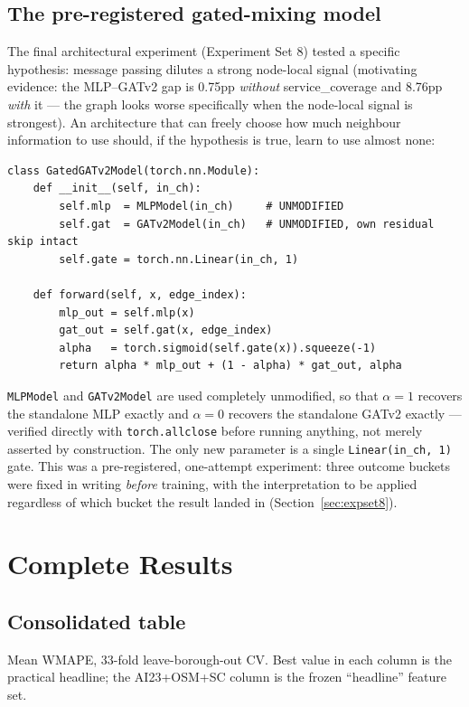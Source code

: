 \documentclass[11pt]{article}
\let\oldsection\section
\renewcommand{\section}[1]{\clearpage\oldsection{\color{sectcolor}#1}}
\let\oldsubsection\subsection
\renewcommand{\subsection}[1]{\oldsubsection{\color{sectcolor}#1}}
\begin{document}
\subsection{The pre-registered gated-mixing model}
\label{sec:gated}
The final architectural experiment (Experiment Set 8) tested a specific hypothesis: message
passing dilutes a strong node-local signal (motivating evidence: the MLP--GATv2 gap is
0.75pp \emph{without} service\_coverage and 8.76pp \emph{with} it --- the graph looks worse
specifically when the node-local signal is strongest). An architecture that can freely
choose how much neighbour information to use should, if the hypothesis is true, learn to use
almost none:
{\small\begin{verbatim}
class GatedGATv2Model(torch.nn.Module):
    def __init__(self, in_ch):
        self.mlp  = MLPModel(in_ch)     # UNMODIFIED
        self.gat  = GATv2Model(in_ch)   # UNMODIFIED, own residual skip intact
        self.gate = torch.nn.Linear(in_ch, 1)

    def forward(self, x, edge_index):
        mlp_out = self.mlp(x)
        gat_out = self.gat(x, edge_index)
        alpha   = torch.sigmoid(self.gate(x)).squeeze(-1)
        return alpha * mlp_out + (1 - alpha) * gat_out, alpha
\end{verbatim}}
\texttt{MLPModel} and \texttt{GATv2Model} are used completely unmodified, so that
$\alpha{=}1$ recovers the standalone MLP exactly and $\alpha{=}0$ recovers the standalone
GATv2 exactly --- verified directly with \texttt{torch.allclose} before running anything,
not merely asserted by construction. The only new parameter is a single
\texttt{Linear(in\_ch, 1)} gate. This was a pre-registered, one-attempt experiment: three
outcome buckets were fixed in writing \emph{before} training, with the interpretation to be
applied regardless of which bucket the result landed in (Section~\ref{sec:expset8}).

\newpage
\section{Complete Results}
\label{sec:results}

\subsection{Consolidated table}
Mean WMAPE, 33-fold leave-borough-out CV. Best value in each column is the practical
headline; the AI23+OSM+SC column is the frozen ``headline'' feature set.
\end{document}
